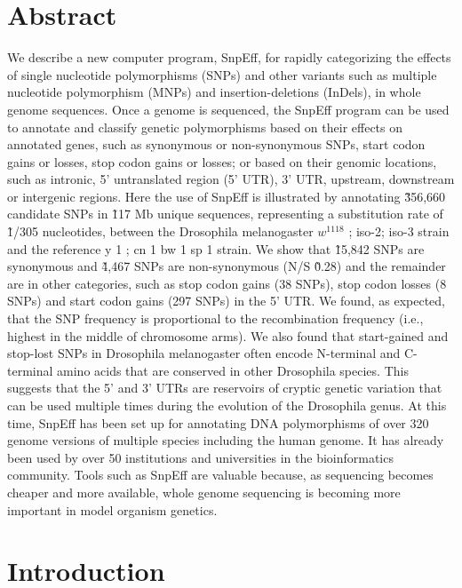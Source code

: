 \section{Abstract}

We describe a new computer program, SnpEff, for rapidly categorizing the effects of single nucleotide polymorphisms (SNPs) and other variants such as multiple nucleotide polymorphism (MNPs) and insertion-deletions (InDels), in whole genome sequences. Once a genome is sequenced, the SnpEff program can be used to annotate and classify genetic polymorphisms based on their effects on annotated genes, such as synonymous or non-synonymous SNPs, start codon gains or losses, stop codon gains or losses; or based on their genomic locations, such as intronic, 5' untranslated region (5' UTR), 3' UTR, upstream, downstream or intergenic regions. Here the use of SnpEff is illustrated by annotating \~356,660 candidate SNPs in \~117 Mb unique sequences, representing a substitution rate of \~1/305 nucleotides, between the Drosophila melanogaster $w^{1118}$ ; iso-2; iso-3 strain and the reference y 1 ; cn 1 bw 1 sp 1 strain. We show that \~15,842 SNPs are synonymous and \~4,467 SNPs are non-synonymous (N/S \~0.28) and the remainder are in other categories, such as stop codon gains (38 SNPs), stop codon losses (8 SNPs) and start codon gains (297 SNPs) in the 5' UTR. We found, as expected, that the SNP frequency is proportional to the recombination frequency (i.e., highest in the middle of chromosome arms).  We also found that start-gained and stop-lost SNPs in Drosophila melanogaster often encode N-terminal and C-terminal amino acids that are conserved in other Drosophila species. This suggests that the 5' and 3' UTRs are reservoirs of cryptic genetic variation that can be used multiple times during the evolution of the Drosophila genus. At this time, SnpEff has been set up for annotating DNA polymorphisms of over 320 genome versions of multiple species including the human genome. It has already been used by over 50 institutions and universities in the bioinformatics community. Tools such as SnpEff are valuable because, as sequencing becomes cheaper and more available, whole genome sequencing is becoming more important in model organism genetics.

\section{Introduction}

